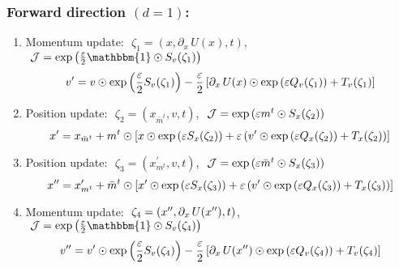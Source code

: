 \documentclass[../main.tex]{subfiles}
\begin{document}
\subsubsection{Forward direction \texorpdfstring{$(d = 1)$}{(d = 1)}:}%
\label{subsubsec:augmented_leapfrog_equations_forward}
%
\begin{enumerate}
  \item Momentum update: $\,\,\zeta_{1} = (x, \partial_{x}\, U(x), t)$,
    $\,\, \mathcal{J} = \exp{\left(\frac{\eps}{2}\mathbbm{1}\odot S_{v}(\zeta_1)\right)}$
    \vspace{-10pt}
    \begin{equation}
      \vp = v \odot \exp{\left(\frac{\eps}{2}S_{v}(\zeta_{1})\right)}%
        - \frac{\eps}{2}\left[\partial_{x}\,U(x)\odot \exp{\left(\eps Q_{v}(\zeta_{1})\right)}%
        + T_{v}(\zeta_{1})\right]
    \end{equation}
    \vspace{-40pt}
  \item Position update: $\,\,\zeta_{2} = (x_{\bar{m}^{t}}, v, t)$,
    $\,\, \mathcal{J} = \exp{\left({\varepsilon}m^{t}\odot S_{x}(\zeta_2)\right)}$
    \vspace{-10pt}
    \begin{equation}
      \xp = x_{\bar{m}^{t}} + m^{t}\odot \left[x \odot \exp{\left(\eps S_{x}(\zeta_{2})\right)}%
        + \eps\left(\vp\odot\exp{\left(\eps Q_{x}(\zeta_{2})\right)} + T_{x}(\zeta_{2})\right)\right]
    \end{equation}
    \vspace{-40pt}
  \item Position update: $\,\,\zeta_{3} = (x^{\prime}_{m^{t}}, v, t)$,
    $\,\, \mathcal{J} = \exp{\left({\varepsilon}\bar{m}^{t}\odot S_{x}(\zeta_3)\right)}$
    \vspace{-10pt}
    \begin{equation}
      \xpp = x^{\prime}_{m^{t}} + \bar{m}^{t}\odot \left[\xp \odot \exp{\left(\eps S_{x}(\zeta_{3})\right)}%
        + \eps\left(\vp\odot\exp{\left(\eps Q_{x}(\zeta_{3})\right)} + T_{x}(\zeta_{3})\right)\right]
    \end{equation}
    \vspace{-40pt}
  \item Momentum update: $\,\,\zeta_{4} = ({x^{\prime\prime}}, \partial_{x}\, U({x^{\prime\prime}}), t)$,
    $\,\, \mathcal{J} = \exp{\left(\frac{\eps}{2}\mathbbm{1}\odot S_{v}(\zeta_{4})\right)}$
    \vspace{-10pt}
    \begin{equation}
      \vpp = \vp \odot \exp{\left(\frac{\eps}{2}S_{v}(\zeta_{4})\right)}%
        - \frac{\eps}{2}\left[\partial_{x}\,U(\xpp)\odot \exp{\left(\eps Q_{v}(\zeta_{4})\right)}%
          + T_{v}(\zeta_{4})\right]
    \end{equation}
\end{enumerate}
\vspace{-30pt}
%
\end{document}
